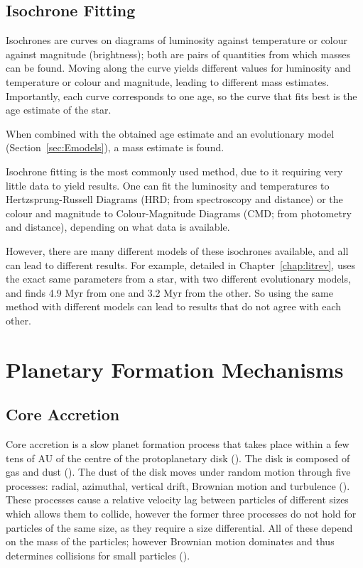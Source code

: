\documentclass[11pt]{report}
\begin{document}
\begin{mainf}
\subsection{Isochrone Fitting}
Isochrones are curves on diagrams of luminosity against temperature or colour against magnitude (brightness); both are pairs of quantities from which masses can be found. 
Moving along the curve yields different values for luminosity and temperature or colour and magnitude, leading to different mass estimates. Importantly, each curve corresponds to one age, so the curve that fits best is the age estimate of the star.

When combined with the obtained age estimate and an evolutionary model (Section~\ref{sec:Emodels}), a mass estimate is found.

Isochrone fitting is the most commonly used method, due to it requiring very little data to yield results. 
One can fit the luminosity and temperatures to Hertzsprung-Russell Diagrams (HRD; from spectroscopy and distance) or the colour and magnitude to Colour-Magnitude Diagrams (CMD; from photometry and distance), depending on what data is available.

However, there are many different models of these isochrones available, and all can lead to different results. For example, detailed in Chapter~\ref{chap:litrev}, \citet{Ginski2020} uses the exact same parameters from a star, with two different evolutionary models, and finds 4.9 Myr from one and 3.2 Myr from the other.
So using the same method with different models can lead to results that do not agree with each other.



\section{Planetary Formation Mechanisms}\label{sec:formation_mechanisms}
\subsection{Core Accretion}
Core accretion is a slow planet formation process that takes place within a few tens of AU of the centre of the protoplanetary disk (\citealp{Dodson-Robinson2009,Helled2014}). The disk is composed of gas and dust (\citealp{Birnstiel2010}). The dust of the disk
moves under random motion through five processes: radial, azimuthal, vertical drift, Brownian motion and turbulence (\citealp{Birnstiel2016}). These processes cause a relative velocity lag between particles of different sizes which allows them to collide, however the former
three processes do not hold for particles of the same size, as they require a size differential. All of these depend on the mass of the particles; however Brownian motion dominates and thus determines collisions for small particles (\citealp{Birnstiel2016}).  


\end{mainf}
\end{document}
